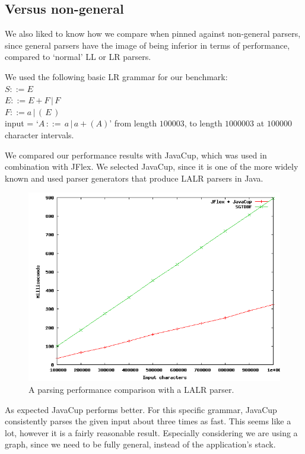 \documentclass[a4paper,10pt]{article}
\begin{document}
\subsection{Versus non-general}

We also liked to know how we compare when pinned against non-general parsers, since general parsers have the image of being inferior in terms of performance, compared to `normal' LL or LR parsers.

We used the following basic LR grammar for our benchmark:\\
$S ::= E$\\
$E ::= E + F\,|\,F$\\
$F ::= a\,|\,(\,E\,)$\\
input = `$A\,::=\,a\,|\,a+(A)$' from length $100003$, to length $1000003$ at $100000$ character intervals.

We compared our performance results with JavaCup, which was used in combination with JFlex. We selected JavaCup, since it is one of the more widely known and used parser generators that produce LALR parsers in Java.

\begin{figure}[H]
\centering
\includegraphics[scale=0.5]{vsLALR.png}
\caption{A parsing performance comparison with a LALR parser.}
\end{figure}

As expected JavaCup performs better. For this specific grammar, JavaCup consistently parses the given input about three times as fast. This seems like a lot, however it is a fairly reasonable result. Especially considering we are using a graph, since we need to be fully general, instead of the application's stack.
\end{document}
